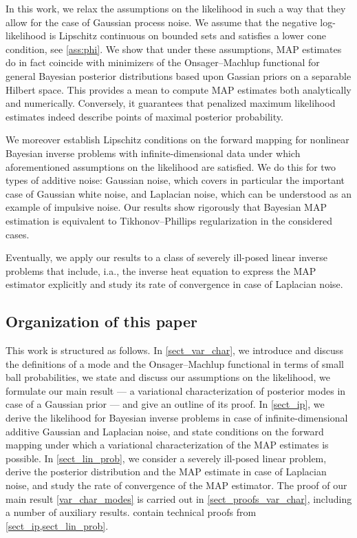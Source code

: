 \documentclass[english]{jnsao}
\theoremstyle{definition}
\begin{document}
In this work, we relax the assumptions on the likelihood in such a way that they allow for the case of Gaussian process noise. We assume that the negative log-likelihood is Lipschitz continuous on bounded sets and satisfies a lower cone condition, see \cref{ass:phi}. 
We show that under these assumptions, MAP estimates do in fact coincide with minimizers of the Onsager--Machlup functional for general Bayesian posterior distributions based upon Gassian priors on a separable Hilbert space. This provides a mean to compute MAP estimates both analytically and numerically. Conversely, it guarantees that penalized maximum likelihood estimates indeed describe points of maximal posterior probability.

We moreover establish Lipschitz conditions on the forward mapping for nonlinear Bayesian inverse problems with infinite-dimensional data under which aforementioned assumptions on the likelihood are satisfied. We do this for two types of additive noise: Gaussian noise, which covers in particular the important case of Gaussian white noise, and Laplacian noise, which can be understood as an example of impulsive noise. Our results show rigorously that Bayesian MAP estimation is equivalent to Tikhonov--Phillips regularization in the considered cases.

Eventually, we apply our results to a class of severely ill-posed linear inverse problems that include, i.a., the inverse heat equation to express the MAP estimator explicitly and study its rate of convergence in case of Laplacian noise.

\subsection{Organization of this paper}

This work is structured as follows. 
In \cref{sect_var_char}, we introduce and discuss the definitions of a mode and the Onsager--Machlup functional in terms of small ball probabilities, we state and discuss our assumptions on the likelihood, we formulate our main result --- a variational characterization of posterior modes in case of a Gaussian prior --- and give an outline of its proof.
In \cref{sect_ip}, we derive the likelihood for Bayesian inverse problems in case of infinite-dimensional additive Gaussian and Laplacian noise, and state conditions on the forward mapping under which a variational characterization of the MAP estimates is possible.
In \cref{sect_lin_prob}, we consider a severely ill-posed linear problem, derive the posterior distribution and the MAP estimate in case of Laplacian noise, and study the rate of convergence of the MAP estimator.
The proof of our main result \cref{var_char_modes} is carried out in \cref{sect_proofs_var_char}, including a number of auxiliary results.
 contain technical proofs from \cref{sect_ip,sect_lin_prob}.
\end{document}
